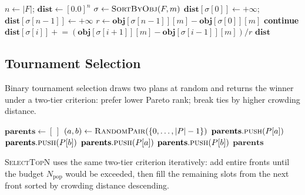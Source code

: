 \begin{algorithm}[t]
\caption{\textsc{CrowdingDist}($F$, $\mathbf{obj}$)}
\label{alg:crowd}
\begin{algorithmic}[1]
\State $n \gets |F|$; \quad $\mathbf{dist} \gets [0.0]^n$
  \State $\sigma \gets \textsc{SortByObj}(F, m)$
  \State $\mathbf{dist}[\sigma[0]] \gets +\infty$; \quad
    $\mathbf{dist}[\sigma[n-1]] \gets +\infty$
  \State $r \gets \mathbf{obj}[\sigma[n-1]][m] - \mathbf{obj}[\sigma[0]][m]$
   \textbf{continue} \EndIf
    \State $\mathbf{dist}[\sigma[i]] \mathrel{+}=
      (\mathbf{obj}[\sigma[i+1]][m] - \mathbf{obj}[\sigma[i-1]][m]) / r$
  \EndFor
\EndFor
\State \Return $\mathbf{dist}$
\end{algorithmic}
\end{algorithm}

\subsection{Tournament Selection}

Binary tournament selection draws two plans at random and returns the winner
under a two-tier criterion: prefer lower Pareto rank; break ties by higher
crowding distance.

\begin{algorithm}[t]
\caption{\textsc{TournamentSelect}($P$, $\mathbf{rank}$, $\mathbf{crowd}$)}
\label{alg:tournament}
\begin{algorithmic}[1]
\State $\mathbf{parents} \gets [\,]$
  \State $(a, b) \gets \textsc{RandomPair}(\{0,\ldots,|P|-1\})$
    $\mathbf{parents}.\textsc{push}(P[a])$
    $\mathbf{parents}.\textsc{push}(P[b])$
    $\mathbf{parents}.\textsc{push}(P[a])$
  \Else
    $\mathbf{parents}.\textsc{push}(P[b])$
  \EndIf
\EndFor
\State \Return $\mathbf{parents}$
\end{algorithmic}
\end{algorithm}

\textsc{SelectTopN} uses the same two-tier criterion iteratively: add entire
fronts until the budget $N_{\mathrm{pop}}$ would be exceeded, then fill the
remaining slots from the next front sorted by crowding distance descending.

